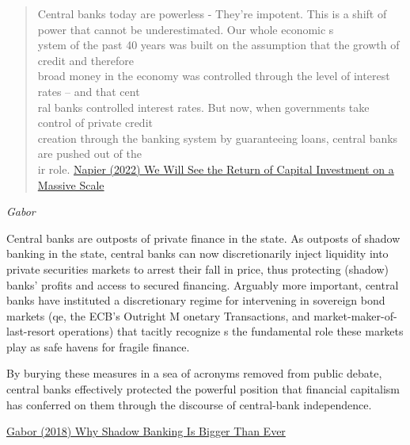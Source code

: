 \documentclass[
]{book}
\begin{document}
\begin{quote}
Central banks today are powerless -
They're impotent. This is a shift of power that cannot be underestimated. Our whole economic s\\
ystem of the past 40 years was built on the assumption that the growth of credit and therefore\\
broad money in the economy was controlled through the level of interest rates -- and that cent\\
ral banks controlled interest rates. But now, when governments take control of private credit\\
creation through the banking system by guaranteeing loans, central banks are pushed out of the\\
ir role.
\href{https://themarket.ch/interview/russell-napier-the-world-will-experience-a-capex-boom-ld.7606}{Napier (2022) We Will See the Return of Capital Investment on a Massive Scale}
\end{quote}

\emph{Gabor}

Central banks are outposts of private finance in the state. As outposts of shadow banking
in the state, central banks can now discretionarily inject liquidity into private
securities markets to arrest their fall in price, thus protecting (shadow) banks' profits
and access to secured financing. Arguably more important, central banks have instituted a
discretionary regime for intervening in sovereign bond markets (qe, the ECB's Outright M
onetary Transactions, and market-maker-of-last-resort operations) that tacitly recognize
s the fundamental role these markets play as safe havens for fragile finance.

By burying these measures in a sea of acronyms removed from public debate, central banks
effectively protected the powerful position that financial capitalism has conferred on
them through the discourse of central-bank independence.

\href{https://jacobin.com/2018/11/why-shadow-banking-is-bigger-than-ever}{Gabor (2018) Why Shadow Banking Is Bigger Than Ever}
\end{document}
